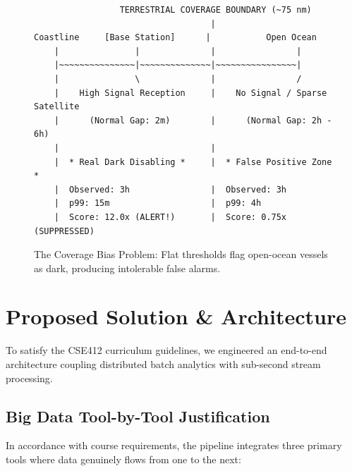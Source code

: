 \documentclass[10pt,twocolumn,a4paper]{article}
\begin{document}
\begin{figure}[t]
    \centering
    \begin{minipage}{0.48\textwidth}
        \ttfamily\scriptsize
        \begin{verbatim}
                 TERRESTRIAL COVERAGE BOUNDARY (~75 nm)
                                   |
Coastline     [Base Station]      |           Open Ocean
    |               |              |                |
    |~~~~~~~~~~~~~~~|~~~~~~~~~~~~~~|~~~~~~~~~~~~~~~~|
    |               \              |                /
    |    High Signal Reception     |    No Signal / Sparse Satellite
    |      (Normal Gap: 2m)        |      (Normal Gap: 2h - 6h)
    |                              |
    |  * Real Dark Disabling *     |  * False Positive Zone *
    |  Observed: 3h                |  Observed: 3h
    |  p99: 15m                    |  p99: 4h
    |  Score: 12.0x (ALERT!)       |  Score: 0.75x (SUPPRESSED)
        \end{verbatim}
    \end{minipage}
    \caption{The Coverage Bias Problem: Flat thresholds flag open-ocean vessels as dark, producing intolerable false alarms.}
    \label{fig:coverage_bias}
\end{figure}

\section{Proposed Solution \& Architecture}
\label{sec:architecture}

To satisfy the CSE412 curriculum guidelines, we engineered an end-to-end architecture coupling distributed batch analytics with sub-second stream processing.

\subsection{Big Data Tool-by-Tool Justification}
In accordance with course requirements, the pipeline integrates three primary tools where data genuinely flows from one to the next:
\end{document}
